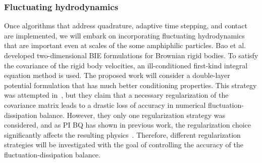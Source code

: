 \subsubsection{Fluctuating hydrodynamics}
\label{subsec:fluctuating}
Once algorithms that address quadrature, adaptive time stepping, and
contact are implemented, we will embark on incorporating fluctuating
hydrodynamics that are important even at scales of the some amphiphilic
particles. Bao et al.~\cite{Bao17,Bao18} developed two-dimensional BIE
formulations for Brownian rigid bodies. To satisfy the covariance of the
rigid body velocities, an ill-conditioned first-kind integral equation
method is used. The proposed work will consider a double-layer potential
formulation that has much better conditioning properties. This strategy
was attempted in~\cite{Bao18}, but they claim that a necessary
regularization of the covariance matrix leads to a drastic loss of
accuracy in numerical fluctuation-dissipation balance. However, they
only one regularization strategy was considered, and as PI BQ has
shown in previous work, the regularization choice significantly affects
the resulting physics~\cite{ong-chr-qua2017}. Therefore, different
regularization strategies will be investigated with the goal of
controlling the accuracy of the fluctuation-dissipation balance.


